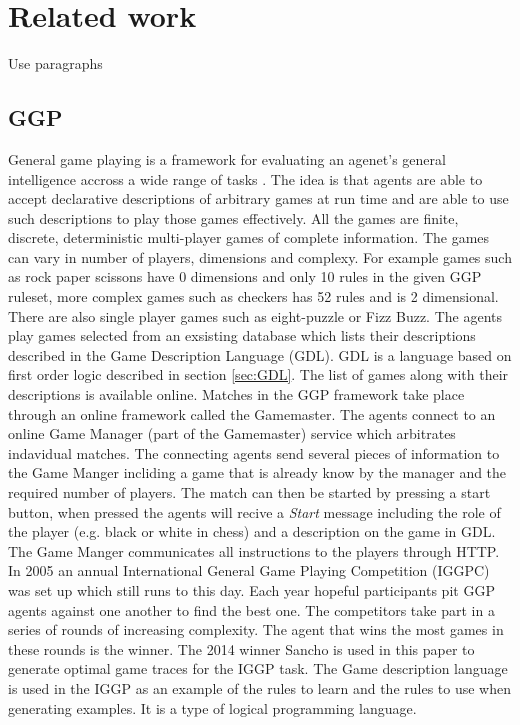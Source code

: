 \chapter{Related work}
\ac{Use paragraphs}

\section{GGP}
General game playing is a framework for evaluating an agenet's general intelligence accross a wide range of tasks \cite{Cropper/IGGP}. The idea is that agents are able to accept declarative descriptions of arbitrary games at run time and are able to use such descriptions to play those games effectively. All the games are finite, discrete, deterministic
multi-player games of complete information. The games can vary in number of players, dimensions and complexy. For example games such as rock paper scissons have 0 dimensions and only 10 rules in the given GGP ruleset, more complex games such as checkers has 52 rules and is 2 dimensional. There are also single player games such as eight-puzzle or Fizz Buzz. The agents play games selected from an exsisting database which lists their descriptions described in the Game Description Language (GDL). GDL is a language based on first order logic described in section \ref{sec:GDL}. The list of games along with their descriptions is available online\cite{GGP-Website}. Matches in the GGP framework take place through an online framework called the Gamemaster. The agents connect to an online Game Manager (part of the Gamemaster) service which arbitrates indavidual matches. The connecting agents send several pieces of information to the Game Manger incliding a game that is already know by the manager and the required number of players. The match can then be started by pressing a start button, when pressed the agents will recive a \textit{Start} message including the role of the player (e.g. black or white in chess) and a description on the game in GDL. The Game Manger communicates all instructions to the players through HTTP\cite{Genesereth/GGPOverview}.
In 2005 an annual International General Game Playing Competition (IGGPC) was set up which still runs to this day. Each year hopeful participants pit GGP agents against one another to find the best one. The competitors take part in a series of rounds of increasing complexity. The agent that wins the most games in these rounds is the winner. The 2014 winner Sancho is used in this paper to generate optimal game traces for the IGGP task. The Game description language is used in the IGGP as an example of the rules to learn and the rules to use when generating examples. It is a type of logical programming language.


